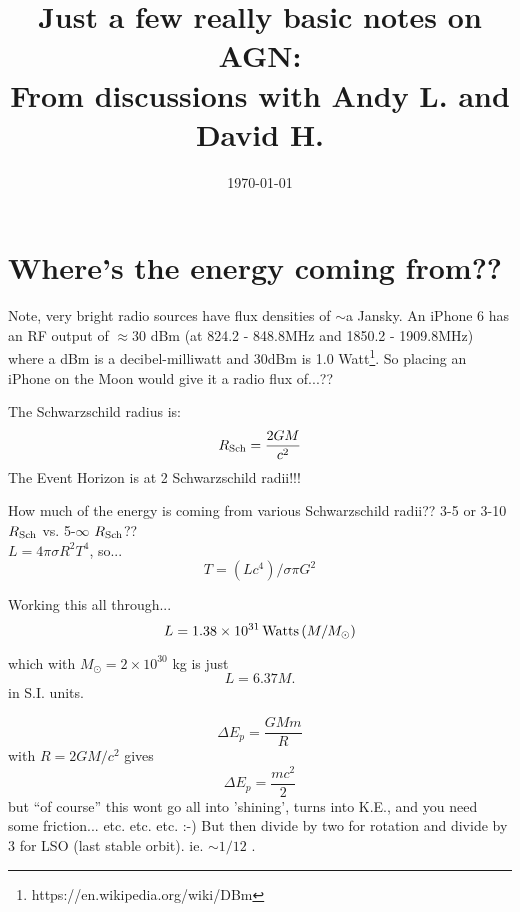 \documentclass[11pt]{article}
\begin{document}
\title{Just a few really basic notes on AGN: \\
From discussions with Andy L. and David H.}
\date{\today}
\maketitle





\section{Where's the energy coming from??}
Note, very bright radio sources have flux densities of $\sim$a
Jansky. An iPhone 6 has an RF output of $\approx$30 dBm (at 824.2 -
848.8MHz and 1850.2 - 1909.8MHz) where a dBm is a decibel-milliwatt
and 30dBm is 1.0 Watt\footnote{https://en.wikipedia.org/wiki/DBm}. So
placing an iPhone on the Moon would give it a radio flux of...??

\noindent
The Schwarzschild radius is:
\begin{equation}
     R_{\rm Sch} = \frac{2GM}{c^2}
\end{equation}
The Event Horizon is at 2 Schwarzschild radii!!!

\noindent
How much of the energy is coming from various Schwarzschild radii??
3-5 or 3-10 $R_{\rm Sch}$ vs. 5-$\infty$ $R_{\rm Sch}$??\\

\noindent
$L = 4\pi \sigma  R^2 T^4$, so...
\begin{equation}
T = (L c^4) / \sigma \pi G^{2} 
\end{equation}

\noindent
Working this all through...
\begin{equation}
  L = 1.38\times10^{31} \, {\rm Watts} \, (M / M_{\odot})
\end{equation}

\noindent
which with  $M_{\odot} = 2 \times 10^{30}$ kg is just 
\begin{equation}
  L = 6.37 M. 
\end{equation}
in S.I. units. 

\begin{equation}
  \Delta E_{p} = \frac{G M m}{R} 
\end{equation}
with $R=2GM/c^2$ gives
\begin{equation}
    \Delta E_{p} = \frac{mc^2}{2}
\end{equation}
but ``of course'' this wont go all into 'shining', turns into K.E., 
and you need some friction... etc. etc. etc. :-) 
But then divide by two for rotation and divide by 3 for LSO (last stable orbit). 
ie. $\sim 1/12$ . 
\end{document}
